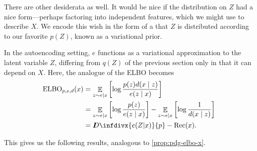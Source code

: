 \documentclass[twoside]{article}
\theoremstyle{plain}
\theoremstyle{definition}
\DeclareMathOperator*{\Ex}{\mathbb{E}} %
\newcommand{\thickD}{I\mkern-8muD}
\newcommand{\kldiv}{\thickD\infdivx}
\begin{document}

There are other desiderata as well. It would be nice if the distribution on $Z$ had a nice form---perhaps factoring into independent features, which we might use to describe $X$. We encode this wish in the form of a that $Z$ is distributed according to our favorite $p(Z)$, known as a variational prior.

In the autoencoding setting, $e$ functions as a variational approximation to the latent variable $Z$, differing from $q(Z)$ of the previous section only in that it can depend on $X$. Here, the analogue of the ELBO becomes
\begin{align*}
	\mathrm{ELBO}_{p,e,d}(x) &= \Ex_{z \sim e|x} \left[\log \frac{p(z) d(x\mid z)}{e(z\mid x)} \right] \\
		&= \Ex_{z \sim e|x}\left[ \log \frac{p(z)}{e(z\mid x)}  \right] - \Ex_{z \sim e|x} \left[\log \frac1{d(x\mid z)} \right] \\
		&= \kldiv{e(Z|x)}{p} - \mathrm{Rec}(x).
\end{align*}

This gives us the following results, analogous to \cref{prop:pdg-elbo-x}.
\end{document}
